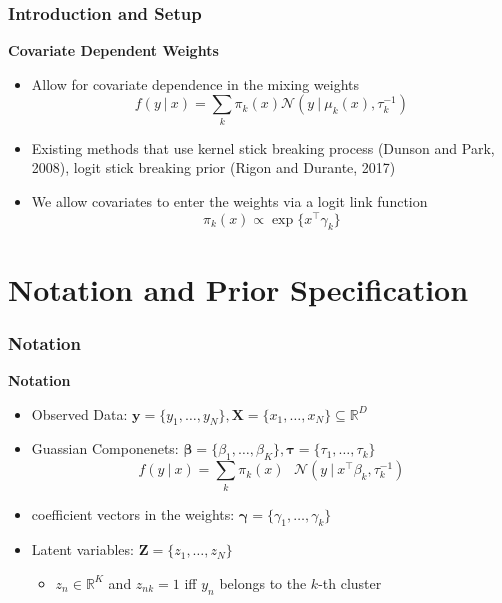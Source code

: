 \documentclass{beamer}
\newcommand\given[1][]{\:#1\vert\:}
\newcommand{\transpose}[1]{#1^{\intercal}}
\newcommand{\R}{\mathbb{R}}
\newcommand{\ksum}{\sum_{k}}
\newcommand{\boldbeta}{\boldsymbol\beta}
\newcommand{\boldgamma}{\boldsymbol\gamma}
\newcommand{\boldtau}{\boldsymbol\tau}
\begin{document}
\begin{frame}
\frametitle{Introduction and Setup}
\textbf{Covariate Dependent Weights}

\begin{itemize}
\item Allow for covariate dependence in the mixing weights
$$f(y \given x) = \ksum \pi_k(x) \mathcal{N}(y \given \mu_k(x), \tau_k^{-1})$$
\item Existing methods that use kernel stick breaking process (Dunson and Park, 2008), logit stick breaking prior (Rigon and Durante, 2017)
\item We allow covariates to enter the weights via a logit link function
$$\pi_k(x) \propto \exp\{\transpose{x}\gamma_k\}$$
\end{itemize}

\end{frame}



\section{Notation and Prior Specification} %


\begin{frame}
\frametitle{Notation}

\textbf{Notation}

\begin{itemize}
	\item Observed Data: $\mathbf{y} = \{y_1, \ldots, y_N \}, \mathbf{X} = \{ x_1, \ldots, x_N \} \subseteq \R^{D}$
	\item Guassian Componenets: $\boldbeta = \{ \beta_1, \ldots, \beta_K\}, \boldtau = \{ \tau_1, \ldots, \tau_k \}$
	$$f(y \given x) = \ksum \pi_k(x) \textrm{ } \mathcal{N}(y \given \transpose{x}\beta_k, \tau_k^{-1})$$
	\item coefficient vectors in the weights: $\boldgamma = \{ \gamma_1, \ldots, \gamma_k\}$
	\item Latent variables: $\mathbf{Z} = \{ z_1, \ldots, z_N \}$
	\begin{itemize}
		\item $z_n \in \R^K$ and $z_{nk} = 1$ iff $y_n$ belongs to the $k$-th cluster
	\end{itemize}
\end{itemize}


\end{frame}
\end{document}
